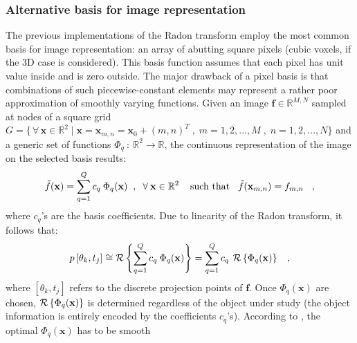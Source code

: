 {\subsubsection{Alternative basis for image representation}
The previous implementations of the Radon transform employ the most common basis for image representation:
an array of abutting square pixels (cubic voxels, if the 3D case is considered).
This basis function assumes that each pixel has unit value inside and is zero outside. The 
major drawback of a pixel basis is that combinations of such piecewise-constant
elements may represent a rather poor approximation of smoothly varying functions.
\newline
Given an image $\mathbf{f} \in \mathbb{R}^{M,N}$ sampled at nodes of a square grid 
$G = \{\, \forall \, \mathbf{x} \in \mathbb{R}^{2}\; |\; \mathbf{x} = \mathbf{x}_{m,n} = \mathbf{x}_{0} + (m,n)^{T}\;,\; m = 1, 2, ..., M \;,\; n = 1, 2, ..., N\}$
and a generic set of functions $\Phi_{q}\::\:\mathbb{R}^{2} \longrightarrow
\mathbb{R}$, the continuous representation of the image on the selected basis results:
\begin{equation}
  \tilde{f}(\mathbf{x}) = \sum\limits_{q=1}^{Q} c_{q}\:\Phi_{q}(\mathbf{x})\;\;,\;\;\forall\:\mathbf{x} \in \mathbb{R}^{2} 
  \hspace{0.4cm}\text{such that}\hspace{0.3cm}\tilde{f}(\mathbf{x}_{m,n} ) = f_{m,n}\hspace{0.3cm},
\label{introduction:radon-transform:alternative-basis-1}
\end{equation}
where $c_{q}$'s are the basis coefficients. Due to linearity of the Radon transform, it follows that:
\begin{equation}
  p\left[\theta_{k},t_{j}\right] \cong \operatorname{\mathcal{R}}\left\{ \sum\limits_{q=1}^{Q} c_{q}\:\Phi_{q}(\mathbf{x}) \right\}
     = \sum\limits_{q=1}^{Q} c_{q}\:\operatorname{\mathcal{R}}\left\{\Phi_{q}(\mathbf{x}) \right\} \hspace{0.3cm},
\label{introduction:radon-transform:alternative-basis-2}     
\end{equation}
where $\left[\theta_{k},t_{j}\right]$ refers to the discrete projection points of $\mathbf{f}$. 
Once $\Phi_{q}(\mathbf{x})$ are chosen, $\operatorname{\mathcal{R}}\left\{\Phi_{q}(\mathbf{x}) \right\}$ is determined regardless
of the object under study (the object information is entirely encoded by the coefficients  $c_{q}$'s).
\newline
According to \cite{Lewitt1990}, the optimal $\Phi_{q}(\mathbf{x})$ has to be smooth
}
